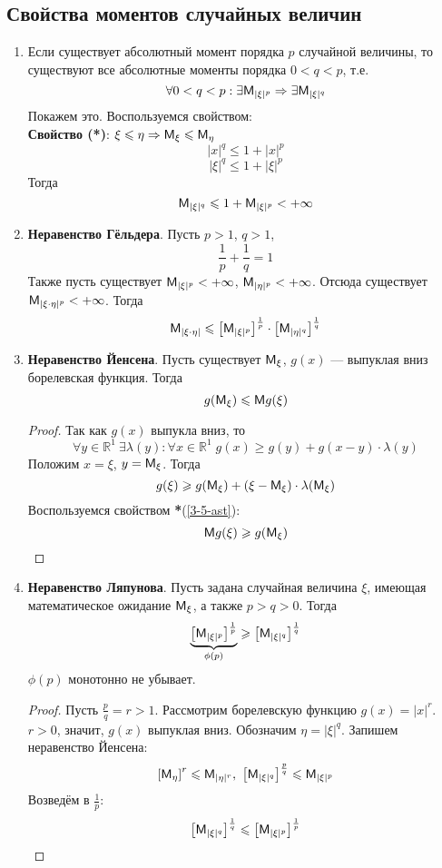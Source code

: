 \subsection{Свойства моментов случайных величин}
\begin{enumerate}
  \item Если существует абсолютный момент порядка $p$ случайной величины, то существуют все абсолютные моменты порядка $0 < q < p$, т.е.
  \[
    \forall 0 < q < p : \exists \mathsf{M}_{|\xi|^p} \Rightarrow \exists \mathsf{M}_{|\xi|^q}
  \]
  Покажем это. Воспользуемся свойством: \\
  \textbf{Свойство (*)}: $\xi \leqslant \eta \Rightarrow \mathsf{M}_{\xi} \leqslant \mathsf{M}_{\eta}$ \label{3-5-ast}
  \[
    |x|^q \leqslant 1 + |x|^p
  \]
  \[
    |\xi|^q \leqslant 1 + |\xi|^p
  \]
  Тогда
  \[
    \mathsf{M}_{|\xi|^q} \leqslant 1 + \mathsf{M}_{|\xi|^p} < +\infty
  \]

  \item \textbf{Неравенство Гёльдера}. Пусть $p > 1$, $q > 1$,
  \[
    \frac{1}{p} + \frac{1}{q} = 1
  \]
  Также пусть существует $\mathsf{M}_{|\xi|^p} < +\infty$, $\mathsf{M}_{|\eta|^p} < +\infty$. Отсюда существует $\mathsf{M}_{|\xi \cdot \eta|^p} < +\infty$. Тогда
  \[
    \mathsf{M}_{|\xi \cdot \eta|} \leqslant \left[ \mathsf{M}_{|\xi|^p} \right]^{\frac{1}{p}} \cdot \left[ \mathsf{M}_{|\eta|^q} \right]^{\frac{1}{q}}
  \]
  \item \textbf{Неравенство Йенсена}. Пусть существует $\mathsf{M}_{\xi}$, $g(x)$ --- выпуклая вниз борелевская функция. Тогда
  \[
    g(\mathsf{M}_{\xi}) \leqslant \mathsf{M} g(\xi)
  \]
  \begin{proof}
    Так как $g(x)$ выпукла вниз, то
    \[
      \forall y \in \mathbb{R}^1 \ \exists \lambda(y) : \forall x \in \mathbb{R}^1 \; g(x) \geqslant g(y) + g(x-y) \cdot \lambda(y)
    \]
    Положим $x = \xi$, $y = \mathsf{M}_{\xi}$. Тогда
    \[
      g(\xi) \geqslant g(\mathsf{M}_{\xi}) + (\xi - \mathsf{M}_{\xi}) \cdot \lambda (\mathsf{M}_{\xi})
    \]
    Воспользуемся свойством \textbf{*}(\ref{3-5-ast}):
    \[
      \mathsf{M} g(\xi) \geqslant g(\mathsf{M}_{\xi})
    \]
  \end{proof}
  \item \textbf{Неравенство Ляпунова}. Пусть задана случайная величина $\xi$, имеющая математическое ожидание $\mathsf{M}_{\xi}$, а также $p > q > 0$. Тогда
  \[
    \underbrace{\left[{\mathsf{M}_{|\xi|^p}} \right]^{\frac{1}{p}}}_{\phi(p)}  \geqslant \left[ \mathsf{M}_{|\xi|^q} \right]^{\frac{1}{q}}
  \]
  $\phi(p)$ монотонно не убывает.
  \begin{proof}
    Пусть $\frac{p}{q} = r > 1$. Рассмотрим борелевскую функцию $g(x) = |x|^r$. $r > 0$, значит, $g(x)$ выпуклая вниз. Обозначим $\eta = |\xi|^q$. Запишем неравенство Йенсена:
    \[
      \left[ \mathsf{M}_{\eta} \right]^r \leqslant \mathsf{M}_{|\eta|^r}, \
      \left[ \mathsf{M}_{|\xi|^q} \right]^{\frac{p}{q}} \leqslant \mathsf{M}_{|\xi|^p}
    \]
    Возведём в $\frac{1}{p}$:
    \[
      \left[ \mathsf{M}_{|\xi|^q} \right]^{\frac{1}{q}} \leqslant \left[ \mathsf{M}_{|\xi|^p} \right]^{\frac{1}{p}}
    \]
  \end{proof}
\end{enumerate}
